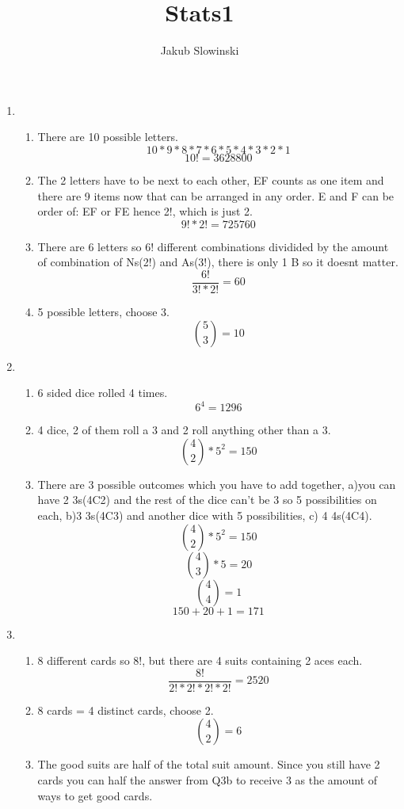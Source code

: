 \documentclass{article}
\title{Stats1}
\author{Jakub Slowinski}
\begin{document}
\begin{enumerate}
  \item 
  \begin{enumerate}[label=(\alph*)]
    \item There are 10 possible letters.
    \[10 * 9 * 8 * 7 * 6 * 5 * 4 * 3 * 2 * 1\]
    \[10! = 3628800\]
    \item The 2 letters have to be next to each other, EF counts as one item and there are 9 items now that can be arranged in any order. E and F can be order of: EF or FE hence 2!, which is just 2.
    \[9! * 2! = 725760\]
    \item There are 6 letters so 6! different combinations dividided by the amount of combination of Ns(2!) and As(3!), there is only 1 B so it doesnt matter. 
    \[ \frac{6!}{3! * 2!} = 60 \]
    \item 5 possible letters, choose 3.
    \[ \binom{5}{3} = 10 \]
  \end{enumerate}
  \item
  \begin{enumerate}[label=(\alph*)]
  
    \item 6 sided dice rolled 4 times.
    \[ 6^4 = 1296 \]
    \item 4 dice, 2 of them roll a 3 and 2 roll anything other than a 3.
    \[ \binom{4}{2} * 5^2 = 150 \]
    
    \item There are 3 possible outcomes which you have to add together, a)you can have 2 3s(4C2) and the rest of the dice can't be 3 so 5 possibilities on each, b)3 3s(4C3) and another dice with 5 possibilities, c) 4 4s(4C4).
    \[ \binom{4}{2} * 5^2 = 150\]
    \[ \binom{4}{3} * 5   = 20\]
    \[ \binom{4}{4}       = 1 \]
    \[ 150+20+1 = 171 \]
    
  \end{enumerate}
  \item
  \begin{enumerate}[label=(\alph*)]
  
    \item 8 different cards so 8!, but there are 4 suits containing 2 aces each.
    \[ \frac{8!}{2!*2!*2!*2!} = 2520 \]
    
    \item 8 cards = 4 distinct cards, choose 2.
    \[ \binom{4}{2} = 6 \]
    \item The good suits are half of the total suit amount. Since you still have 2 cards you can half the answer from Q3b to receive 3 as the amount of ways to get good cards.
  \end{enumerate}
\end{enumerate}
\end{document}
